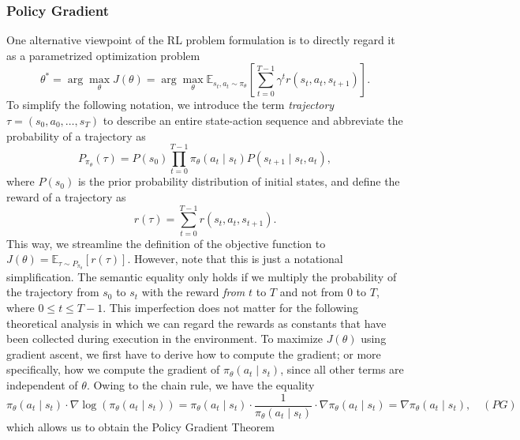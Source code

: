 \documentclass[a4paper, 11pt]{article}
\begin{document}
	\subsubsection{Policy Gradient}
	One alternative viewpoint of the RL problem formulation is to directly regard it as a parametrized optimization problem 
	\[\theta^{*}=\arg\max_{\theta}J(\theta)=\arg\max_{\theta}\mathbb{E}_{s_t,a_t\sim \pi_\theta}\left[\sum_{t=0}^{T-1}\gamma^t r(s_t,a_t,s_{t+1})\right].\]
	To simplify the following notation, we introduce the term \textit{trajectory} $\tau=(s_0,a_0,\dots ,s_T)$ to describe an entire state-action sequence and abbreviate the probability of a trajectory as 
	\[P_{\pi_{\theta}}(\tau)=P(s_0)\prod_{t=0}^{T-1}\pi_\theta(a_t\mid s_t)P(s_{t+1}\mid s_t,a_t),\]
	where $P(s_0)$ is the prior probability distribution of initial states, and define the reward of a trajectory as
	\[r(\tau)=\sum_{t=0}^{T-1}r(s_t,a_t,s_{t+1}).\]
	This way, we streamline the definition of the objective function to
	$J(\theta)=\mathbb{E}_{\tau\sim P_{\pi_{\theta}}}\left[r(\tau)\right]$.
	However, note that this is just a notational simplification. The semantic equality only holds if we multiply the probability of the trajectory from $s_0$ to $s_t$ with the reward \textit{from} $t$ to $T$ and not from $0$ to $T$, where $0\leq t\leq T-1$.
	This imperfection does not matter for the following theoretical analysis in which we can regard the rewards as constants that have been collected during execution in the environment.
	To maximize $J(\theta)$ using gradient ascent, we first have to derive how to compute the gradient; or more specifically, how we compute the gradient of $\pi_\theta(a_t\mid s_t)$, since all other terms are independent of $\theta$.
	Owing to the chain rule, we have the equality
	\[\pi_\theta(a_t\mid s_t)\cdot \nabla\log\left(\pi_\theta(a_t\mid s_t)\right) =  \pi_\theta(a_t\mid s_t)\cdot \frac{1}{\pi_\theta(a_t\mid s_t)} \cdot \nabla \pi_\theta(a_t\mid s_t)=\nabla \pi_\theta(a_t\mid s_t),\quad (PG)\]
	which allows us to obtain the Policy Gradient Theorem
\end{document}
